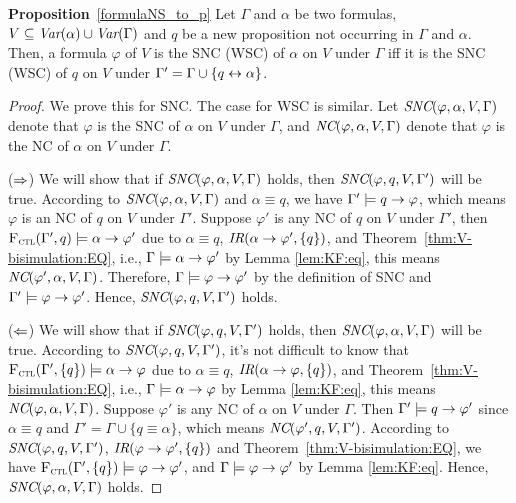 \documentclass[twoside,11pt]{article}
\begin{document}
	\noindent\textbf{Proposition}~\ref{formulaNS_to_p}   Let $\Gamma$ and $\alpha$ be two formulas, $V \subseteq \textit{Var}(\alpha) \cup \textit{Var}(\Gamma)$  and $q$ be a new proposition not occurring in $\Gamma$ and $\alpha$.
	Then, a formula $\varphi$ of $V$ is the SNC (WSC) of $\alpha$ on $V$ under  $\Gamma$ iff it is the SNC (WSC) of $q$ on $V$ under $\Gamma' = \Gamma \cup \{q \leftrightarrow \alpha\}$.
	\\
	\begin{proof}
		We prove this for SNC. The case for WSC is similar.
		Let $\emph{SNC}(\varphi,\alpha,V,\Gamma)$ denote that $\varphi$ is the SNC of $\alpha$ on $V$ under $\Gamma$, and  $\emph{NC}(\varphi,\alpha,V,\Gamma)$ denote that $\varphi$ is the NC of $\alpha$ on $V$ under $\Gamma$.
		
		($\Rightarrow$) We will show that if $\emph{SNC}(\varphi,\alpha,V,\Gamma)$ holds, then $\emph{SNC}(\varphi,q,V,\Gamma')$ will be true. According to $\emph{SNC}(\varphi,\alpha,V,\Gamma)$ and $\alpha\equiv q$, we have $\Gamma' \models q\rightarrow \varphi$, which means $\varphi$ is an NC of $q$ on $V$ under $\Gamma'$. Suppose $\varphi'$ is any NC of $q$ on $V$ under $\Gamma'$, then ${\textsc{F}_{\textsc{ctl}}}(\Gamma',q)\models \alpha \rightarrow \varphi'$ due to $\alpha\equiv q$, $\emph{IR}(\alpha \rightarrow \varphi', \{q\})$, and Theorem~\ref{thm:V-bisimulation:EQ}, i.e., $\Gamma \models \alpha \rightarrow \varphi'$ by Lemma \ref{lem:KF:eq}, this means $\emph{NC}(\varphi',\alpha,V,\Gamma)$. Therefore, $\Gamma \models \varphi \rightarrow \varphi'$ by the definition of SNC and $\Gamma' \models \varphi \rightarrow \varphi'$. Hence, $\emph{SNC}(\varphi,q,V,\Gamma')$ holds.
		
		($\Leftarrow$) We will show that if $\emph{SNC}(\varphi,q,V,\Gamma')$ holds, then $\emph{SNC}(\varphi,\alpha,V,\Gamma)$ will be true. According to $\emph{SNC}(\varphi,q,V,\Gamma')$, it's not difficult to know that ${\textsc{F}_{\textsc{ctl}}}(\Gamma', \{q\})\models \alpha \rightarrow \varphi$ due to $\alpha\equiv q$, $\emph{IR}(\alpha \rightarrow \varphi, \{q\})$, and Theorem~\ref{thm:V-bisimulation:EQ}, i.e., $\Gamma \models \alpha \rightarrow \varphi$ by Lemma \ref{lem:KF:eq}, this means $\emph{NC}(\varphi,\alpha,V,\Gamma)$. Suppose $\varphi'$ is any NC of $\alpha$ on $V$ under $\Gamma$. Then $\Gamma' \models q \rightarrow \varphi'$ since $\alpha\equiv q$ and $\Gamma'=\Gamma \cup \{q\equiv \alpha\}$, which means $\emph{NC}(\varphi',q,V,\Gamma')$. According to $\emph{SNC}(\varphi,q,V,\Gamma')$, $\emph{IR}(\varphi \rightarrow \varphi', \{q\})$ and Theorem~\ref{thm:V-bisimulation:EQ}, we have
		${\textsc{F}_{\textsc{ctl}}}(\Gamma', \{q\})\models \varphi \rightarrow \varphi'$, and $\Gamma \models \varphi \rightarrow \varphi'$ by Lemma \ref{lem:KF:eq}. Hence, $\emph{SNC}(\varphi,\alpha,V, \Gamma)$ holds.
	\end{proof}
	
\end{document}
